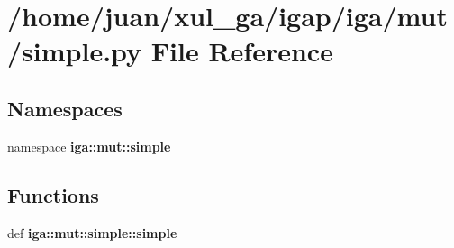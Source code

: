 \section{/home/juan/xul\_\-ga/igap/iga/mut/simple.py File Reference}
\label{mut_2simple_8py}
\subsection*{Namespaces}
\begin{CompactItemize}
\item 
namespace {\bf iga::mut::simple}
\end{CompactItemize}
\subsection*{Functions}
\begin{CompactItemize}
\item 
def {\bf iga::mut::simple::simple}
\end{CompactItemize}
